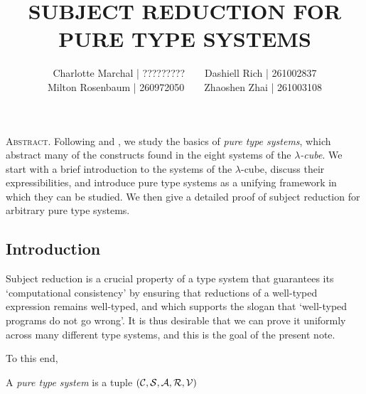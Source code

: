 \documentclass[reqno, twoside]{article}
\begin{document}
    \title{\textbf{\normalsize\MakeUppercase{Subject Reduction for Pure Type Systems}}}
    \author{\small Charlotte Marchal | ?????????\ \ \ \ Dashiell Rich | 261002837\\\small Milton Rosenbaum | 260972050\ \ \ \ Zhaoshen Zhai | 261003108}
    \date{}
    \maketitle

    \begin{center}
        \vspace{-0.3in}
        \begin{minipage}{0.85\textwidth}
            {\footnotesize{\textsc{Abstract.}} Following \cite{GN91} and \cite{Bar91}, we study the basics of \textit{pure type systems}, which abstract many of the constructs found in the eight systems of the \textit{$\lambda$-cube}. We start with a brief introduction to the systems of the $\lambda$-cube, discuss their expressibilities, and introduce pure type systems as a unifying framework in which they can be studied. We then give a detailed proof of subject reduction for arbitrary pure type systems.}
        \end{minipage}
    \end{center}

    \subsection*{Introduction}

    Subject reduction is a crucial property of a type system that guarantees its `computational consistency' by ensuring that reductions of a well-typed expression remains well-typed, and which supports the slogan that `well-typed programs do not go wrong'. It is thus desirable that we can prove it uniformly across many different type systems, and this is the goal of the present note.

    To this end, 

    \begin{definition}
        A \textit{pure type system} is a tuple $(\mathcal{C},\mathcal{S},\mathcal{A},\mathcal{R},\mathcal{V})$ \TODO
    \end{definition}
\end{document}

